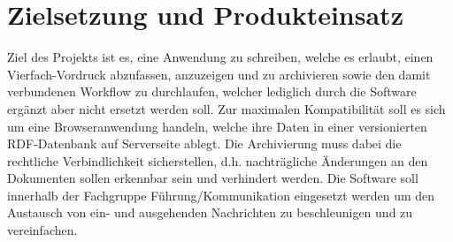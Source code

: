 \section{Zielsetzung und Produkteinsatz}
Ziel des Projekts ist es, eine Anwendung zu schreiben, welche es erlaubt, einen Vierfach-Vordruck
abzufassen, anzuzeigen und zu archivieren sowie den damit verbundenen Workflow zu durchlaufen, 
welcher lediglich durch die Software ergänzt aber nicht ersetzt werden soll. 
Zur maximalen Kompatibilität soll es sich um eine Browseranwendung handeln, welche ihre Daten in
einer versionierten RDF-Datenbank auf Serverseite ablegt. 
Die Archivierung muss dabei die rechtliche Verbindlichkeit sicherstellen, d.h. nachträgliche
Änderungen an den Dokumenten sollen erkennbar sein und verhindert werden.
Die Software soll innerhalb der Fachgruppe Führung/Kommunikation eingesetzt werden um den Austausch 
von ein- und ausgehenden Nachrichten zu beschleunigen und zu vereinfachen.
